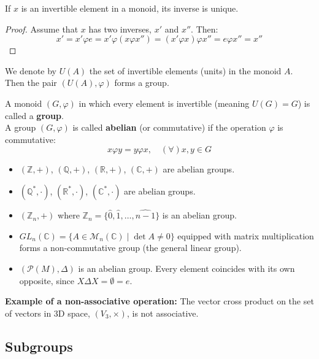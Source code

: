 \begin{proposition}
If $x$ is an invertible element in a monoid, its inverse is unique.
\end{proposition}

\begin{proof}
Assume that $x$ has two inverses, $x'$ and $x''$. Then:
$$ x' = x' \varphi e = x' \varphi (x \varphi x'') = (x' \varphi x) \varphi x'' = e \varphi x'' = x'' $$
\end{proof}

We denote by $U(A)$ the set of invertible elements (units) in the monoid $A$. Then the pair $(U(A), \varphi)$ forms a group.

\begin{definition}
A monoid $(G, \varphi)$ in which every element is invertible (meaning $U(G) = G$) is called a \textbf{group}. \\
A group $(G, \varphi)$ is called \textbf{abelian} (or commutative) if the operation $\varphi$ is commutative:
$$ x \varphi y = y \varphi x, \quad (\forall) x, y \in G $$
\end{definition}

\begin{example}\leavevmode
\begin{itemize}
    \item $(\mathbb{Z}, +)$, $(\mathbb{Q}, +)$, $(\mathbb{R}, +)$, $(\mathbb{C}, +)$ are abelian groups.
    \item $(\mathbb{Q}^*, \cdot)$, $(\mathbb{R}^*, \cdot)$, $(\mathbb{C}^*, \cdot)$ are abelian groups.
    \item $(\mathbb{Z}_n, +)$ where $\mathbb{Z}_n = \{\hat{0}, \hat{1}, \dots, \widehat{n-1}\}$ is an abelian group.
    \item $GL_n(\mathbb{C}) = \{A \in \mathcal{M}_n(\mathbb{C}) \mid \det A \neq 0\}$ equipped with matrix multiplication forms a non-commutative group (the general linear group).
    \item $(\mathcal{P}(M), \Delta)$ is an abelian group. Every element coincides with its own opposite, since $X \Delta X = \emptyset = e$.
\end{itemize}
\end{example}

\textbf{Example of a non-associative operation:} The vector cross product on the set of vectors in 3D space, $(V_3, \times)$, is not associative.



\subsection*{Subgroups}

